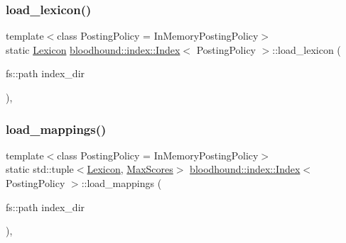 \mbox{\label{classbloodhound_1_1index_1_1Index_a80968041cad02a4006fd4b633c279030}} 
\subsubsection{\texorpdfstring{load\+\_\+lexicon()}{load\_lexicon()}}
{\footnotesize\ttfamily template$<$class Posting\+Policy = In\+Memory\+Posting\+Policy$>$ \\
static \mbox{\hyperlink{namespacebloodhound_a94032a3533df0a1b6d3435bad57e6499}{Lexicon}} \mbox{\hyperlink{classbloodhound_1_1index_1_1Index}{bloodhound\+::index\+::\+Index}}$<$ Posting\+Policy $>$\+::load\+\_\+lexicon (\begin{DoxyParamCaption}\item[{fs\+::path}]{index\+\_\+dir }\end{DoxyParamCaption})\hspace{0.3cm}{\ttfamily [inline]}, {\ttfamily [static]}}

\mbox{\label{classbloodhound_1_1index_1_1Index_a779359e7ce40294dd3d3666c00762700}} 
\subsubsection{\texorpdfstring{load\+\_\+mappings()}{load\_mappings()}}
{\footnotesize\ttfamily template$<$class Posting\+Policy = In\+Memory\+Posting\+Policy$>$ \\
static std\+::tuple$<$\mbox{\hyperlink{namespacebloodhound_a94032a3533df0a1b6d3435bad57e6499}{Lexicon}}, \mbox{\hyperlink{namespacebloodhound_a687d80c6f992eba8b820bf30a482f4b4}{Max\+Scores}}$>$ \mbox{\hyperlink{classbloodhound_1_1index_1_1Index}{bloodhound\+::index\+::\+Index}}$<$ Posting\+Policy $>$\+::load\+\_\+mappings (\begin{DoxyParamCaption}\item[{fs\+::path}]{index\+\_\+dir }\end{DoxyParamCaption})\hspace{0.3cm}{\ttfamily [inline]}, {\ttfamily [static]}}

